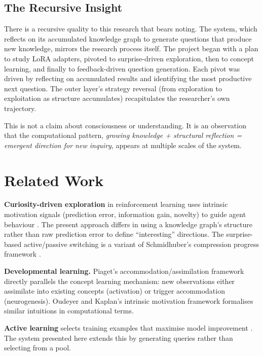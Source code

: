 \documentclass[conference]{IEEEtran}
\begin{document}
\subsection{The Recursive Insight}

There is a recursive quality to this research that bears noting. The system, which reflects on its accumulated knowledge graph to generate questions that produce new knowledge, mirrors the research process itself. The project began with a plan to study LoRA adapters, pivoted to surprise-driven exploration, then to concept learning, and finally to feedback-driven question generation. Each pivot was driven by reflecting on accumulated results and identifying the most productive next question. The outer layer's strategy reversal (from exploration to exploitation as structure accumulates) recapitulates the researcher's own trajectory.

This is not a claim about consciousness or understanding. It is an observation that the computational pattern, \emph{growing knowledge + structural reflection = emergent direction for new inquiry}, appears at multiple scales of the system.


\section{Related Work}
\label{sec:related}

\textbf{Curiosity-driven exploration} in reinforcement learning uses intrinsic motivation signals (prediction error, information gain, novelty) to guide agent behaviour \cite{pathak2017,burda2019,schmidhuber1991}. The present approach differs in using a knowledge graph's structure rather than raw prediction error to define ``interesting'' directions. The surprise-based active/passive switching is a variant of Schmidhuber's compression progress framework \cite{schmidhuber1991}.

\textbf{Developmental learning.} Piaget's accommodation/assimilation framework \cite{piaget1952} directly parallels the concept learning mechanism: new observations either assimilate into existing concepts (activation) or trigger accommodation (neurogenesis). Oudeyer and Kaplan's intrinsic motivation framework \cite{oudeyer2007} formalises similar intuitions in computational terms.

\textbf{Active learning} selects training examples that maximise model improvement \cite{settles2009}. The system presented here extends this by generating queries rather than selecting from a pool.
\end{document}
